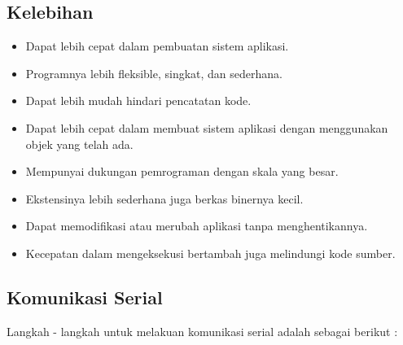 	\subsection{Kelebihan}
		\begin{itemize}
			\item Dapat lebih cepat dalam pembuatan sistem aplikasi.
			\item Programnya lebih fleksible, singkat, dan sederhana.
			\item Dapat lebih mudah hindari pencatatan kode.
			\item Dapat lebih cepat dalam membuat sistem aplikasi dengan menggunakan objek yang telah ada.
			\item Mempunyai dukungan pemrograman dengan skala yang besar.
			\item Ekstensinya lebih sederhana juga berkas binernya kecil.
			\item Dapat memodifikasi atau merubah aplikasi tanpa menghentikannya.
			\item Kecepatan dalam mengeksekusi bertambah juga melindungi kode sumber.
		\end{itemize}
	
	\subsection{Komunikasi Serial}
		Langkah - langkah untuk melakuan komunikasi serial adalah sebagai berikut :
		
